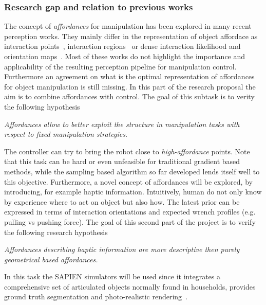 \subsubsection{Research gap and relation to previous works}
The concept of \emph{affordances} for manipulation has been explored in many recent perception works. They mainly differ in the representation of object affordace as interaction points~\cite{gao2021kpam}, interaction regions~\cite{nagarajan2019grounded} or dense interaction likelihood and orientation maps~\cite{mo2021where2act}. Most of these works do not highlight the importance and applicability of the resulting perception pipeline for manipulation control. Furthermore an agreement on what is the optimal representation of affordances for object manipulation is still missing. In this part of the research proposal the aim is to combine affordances with control. The goal of this subtask is to verity the following hypothesis
\begin{displayquote}
\textit{Affordances allow to better exploit the structure in manipulation tasks with respect to fixed manipulation strategies.}
\end{displayquote}
The controller can try to bring the robot close to \emph{high-affordance} points. Note that this task can be hard or even unfeasible for traditional gradient based methods, while the sampling based algorithm so far developed lends itself well to this objective. 
Furthermore, a novel concept of affordances will be explored, by introducing, for example haptic information. Intuitively, human do not only know by experience where to act on object but also how. The latest prior can be expressed in terms of interaction orientations and expected wrench profiles (e.g. pulling vs pushing force). The goal of this second part of the project is to verify the following research hypothesis
\begin{displayquote}
\textit{Affordances describing haptic information are more descriptive then purely geometrical based affordances.}
\end{displayquote} 
In this task the SAPIEN simulators will be used since it integrates a comprehensive set of articulated objects normally found in households, provides ground truth segmentation and photo-realistic rendering~\cite{Xiang_2020_SAPIEN}. 

